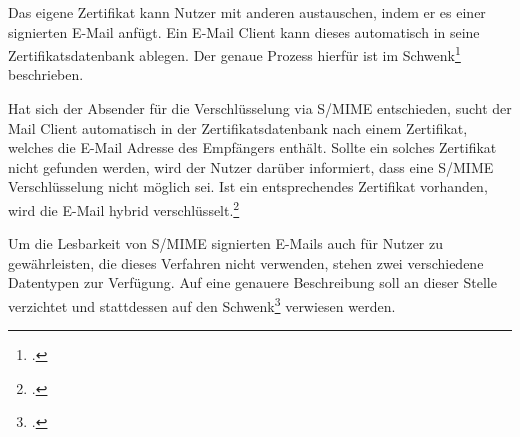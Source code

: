\documentclass  [paper=a4,
				fontsize=12pt,
				listof=totoc,
				bibliography=totoc
				]{scrreprt}
\begin{document}
				Das eigene Zertifikat kann Nutzer mit anderen austauschen, indem er es einer signierten E-Mail anfügt. Ein E-Mail Client kann dieses automatisch in seine Zertifikatsdatenbank ablegen. Der genaue Prozess hierfür ist im Schwenk\footcite[][S. 65 ff.]{Schwenk} beschrieben.
				\medskip
														
				Hat sich der Absender für die Verschlüsselung via \ac{S/MIME} entschieden, sucht der Mail Client automatisch in der Zertifikatsdatenbank nach einem Zertifikat, welches die E-Mail Adresse des Empfängers enthält. Sollte ein solches Zertifikat nicht gefunden werden, wird der Nutzer darüber informiert, dass eine \ac{S/MIME} Verschlüsselung nicht möglich sei. Ist ein entsprechendes Zertifikat vorhanden, wird die E-Mail hybrid verschlüsselt.\footcite[][S. 65]{Schwenk}
				
				
				Um die Lesbarkeit von \ac{S/MIME} signierten E-Mails auch für Nutzer zu gewährleisten, die dieses Verfahren nicht verwenden, stehen zwei verschiedene Datentypen zur Verfügung. Auf eine genauere Beschreibung soll an dieser Stelle verzichtet und stattdessen auf den Schwenk\footcite[Vgl.][S. 65]{Schwenk} verwiesen werden.
				\medskip
				

\end{document}

